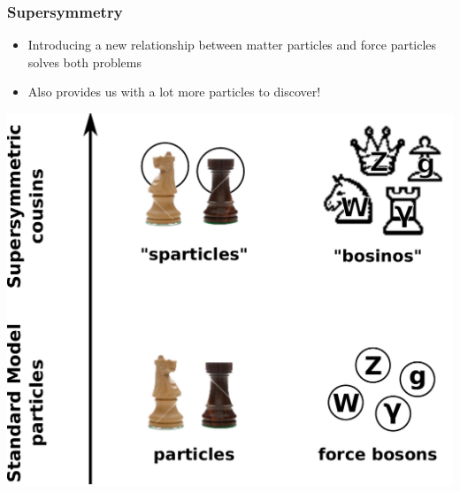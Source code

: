 \documentclass[compress]{beamer}
\begin{document}
\begin{frame}
\frametitle{Supersymmetry}
\begin{itemize}
\item Introducing a new relationship between matter particles and
  force particles solves both problems
\item Also provides us with a lot more particles to discover!
\end{itemize}

\begin{center}
\includegraphics[width=0.65\linewidth]{supersymmetry.pdf}
\end{center}
\end{frame}
\end{document}
